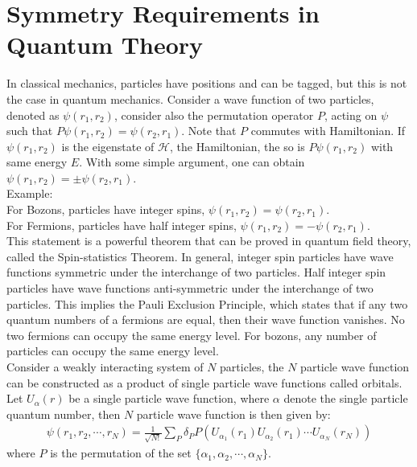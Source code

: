 \documentclass[11pt,oneside]{book}
\theoremstyle{break}
\theoremstyle{break}
\newcommand{\example}{\color{green}Example: \color{black}}
\begin{document}
\section[Symmetry Requirements in Quantum Theory]{\color{red}Symmetry Requirements in Quantum Theory\color{black}}
In classical mechanics, particles have positions and can be tagged, but this is not the case in quantum mechanics. Consider a wave function of two particles, denoted as $\psi(r_1,r_2)$, consider also the permutation operator $P$, acting on $\psi$ such that $P\psi(r_1,r_2) = \psi(r_2,r_1)$. Note that $P$ commutes with Hamiltonian. If $\psi(r_1,r_2)$ is the eigenstate of $\mathcal{H}$, the Hamiltonian, the so is $P\psi(r_1,r_2)$ with same energy $E$. With some simple argument, one can obtain $\psi(r_1,r_2) = \pm \psi(r_2,r_1)$.\\

\example\\
For Bozons, particles have integer spins, $\psi(r_1,r_2) = \psi(r_2,r_1)$.\\ 
For Fermions, particles have half integer spins,  $\psi(r_1,r_2) = -\psi(r_2,r_1)$. \\
This statement is a powerful theorem that can be proved in quantum field theory, called the Spin-statistics Theorem. In general, integer spin particles have wave functions symmetric under the interchange of two particles. Half integer spin particles have wave functions anti-symmetric under the interchange of two particles. This implies the Pauli Exclusion Principle, which states that if any two quantum numbers of a fermions are equal, then their wave function vanishes. No two fermions can occupy the same energy level. For bozons, any number of particles can occupy the same energy level.\\


Consider a weakly interacting system of $N$ particles, the $N$ particle wave function can be constructed as a product of single particle wave functions called orbitals. Let $U_\alpha(r)$ be a single particle wave function, where $\alpha$ denote the single particle quantum number, then $N$ particle wave function is then given by:
\begin{align*}
\psi(r_1,r_2,\cdots, r_N) = \frac{1}{\sqrt{N!}} \sum_P \delta_P P(U_{\alpha_1}(r_1)U_{\alpha_2}(r_1) \cdots U_{\alpha_N}(r_N))
\end{align*}
where $P$ is the permutation of the set $\{\alpha_1,\alpha_2,\cdots, \alpha_N\}$. 
\end{document}
